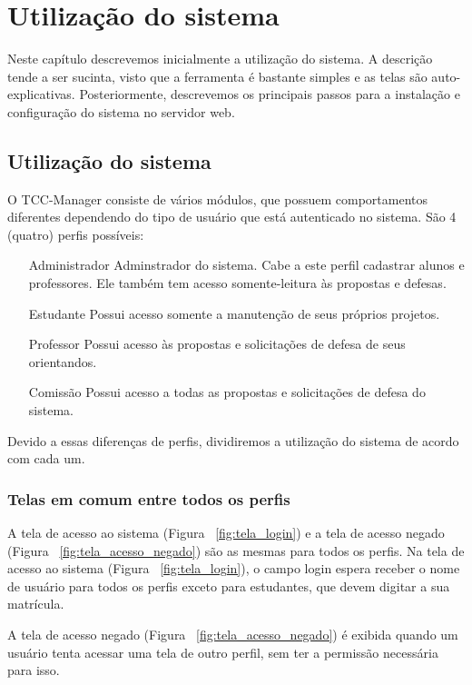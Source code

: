 \chapter{Utilização do sistema}
\label{cha:utilizacao}

Neste capítulo descrevemos inicialmente a utilização do sistema. A descrição tende
a ser sucinta, visto que a ferramenta é bastante simples e as telas são auto-explicativas.
Posteriormente, descrevemos os principais passos para a instalação e configuração
do sistema no servidor web.

\section{Utilização do sistema}
O TCC-Manager consiste de vários módulos, que possuem comportamentos diferentes dependendo do 
tipo de usuário que está autenticado no sistema. São 4 (quatro) perfis possíveis:
\begin{itemize}
\item[Administrador] Adminstrador do sistema. Cabe a este perfil cadastrar alunos e professores.
Ele também tem acesso somente-leitura às propostas e defesas.
\item[Estudante] Possui acesso somente a manutenção de seus próprios projetos.
\item[Professor] Possui acesso às propostas e solicitações de defesa de seus orientandos.
\item[Comissão] Possui acesso a todas as propostas e solicitações de defesa do sistema.
\end{itemize}

Devido a essas diferenças de perfis, dividiremos a utilização do sistema de acordo com cada um.

\subsection{Telas em comum entre todos os perfis}
A tela de acesso ao sistema (Figura ~\ref{fig:tela_login}) e a tela de acesso negado (Figura ~\ref{fig:tela_acesso_negado}) são as mesmas para todos os perfis.
Na tela de acesso ao sistema (Figura ~\ref{fig:tela_login}), o campo login espera receber o nome de usuário
para todos os perfis exceto para estudantes, que devem digitar a sua matrícula.

A tela de acesso negado (Figura ~\ref{fig:tela_acesso_negado}) é exibida quando um usuário tenta acessar uma tela de outro perfil, sem
ter a permissão necessária para isso.

